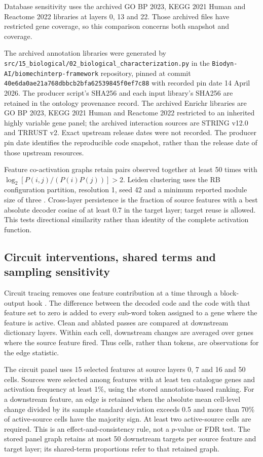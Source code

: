 \documentclass[review,authoryear,12pt]{elsarticle}
\begin{document}
Database sensitivity uses the archived GO BP 2023, KEGG 2021 Human and Reactome 2022 libraries at
layers 0, 13 and 22. Those archived files have restricted gene coverage, so this comparison concerns
both snapshot and coverage.

The archived annotation libraries were generated by
\texttt{src/15\_biological/02\_biological\_characterization.py} in the
\texttt{Biodyn-AI/biomechinterp-framework} repository, pinned at commit
\texttt{40e6da0ae21a768dbbcb2bfa62539845f0ef7c88} with recorded pin date 14 April 2026.
The producer script's SHA256 and each input library's SHA256 are retained in the ontology
provenance record. The archived Enrichr libraries are GO BP 2023, KEGG 2021 Human and
Reactome 2022 restricted to an inherited highly variable gene panel; the archived interaction
sources are STRING v12.0 and TRRUST v2. Exact upstream release dates were not recorded.
The producer pin date identifies the reproducible code snapshot, rather than the
release date of those upstream resources.

Feature co-activation graphs retain pairs observed together at least
50 times with $\log_2[P(i,j)/(P(i)P(j))]>2$. Leiden clustering uses the RB configuration
partition, resolution 1, seed 42 and a minimum reported module size of three \citep{ref32}.
Cross-layer persistence is the fraction of source features with a best absolute decoder cosine of
at least 0.7 in the target layer; target reuse is allowed. This tests directional similarity rather
than identity of the complete activation function.

\subsection{Circuit interventions, shared terms and sampling sensitivity}

Circuit tracing removes one feature contribution at a time through a block-output hook
\citep{ref22}. The difference between the decoded code and the code with that feature set to zero
is added to every sub-word token assigned to a gene where the feature is active. Clean and ablated
passes are compared at downstream dictionary layers. Within each cell, downstream changes are
averaged over genes where the source feature fired. Thus cells, rather than tokens, are observations
for the edge statistic.

The circuit panel uses 15 selected features at source layers 0, 7 and 16 and 50 cells.
Sources were selected among features with at least ten catalogue genes and activation frequency
at least 1\%, using the stored annotation-based ranking. For a downstream feature, an edge is
retained when the absolute mean cell-level change divided by its sample standard deviation exceeds
0.5 and more than 70\% of active-source cells have the majority sign. At least two active-source
cells are required. This is an effect-and-consistency rule, not a $p$-value or FDR test.
The stored panel graph retains at most 50 downstream targets per source feature and target layer;
its shared-term proportions refer to that retained graph.
\end{document}
